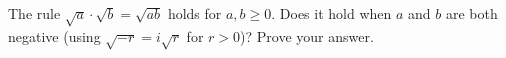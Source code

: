 The rule $\sqrt a\cdot\sqrt b=\sqrt{ab}$ holds for $a,b\ge0$. Does it hold when $a$ and $b$ are both negative (using $\sqrt{-r}=i\sqrt r$ for $r>0$)? Prove your answer.
